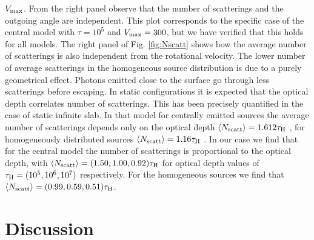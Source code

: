 $V_{\rm max}$.
From the right panel observe that the number of scatterings and the
outgoing angle are independent.
This plot corresponds to the specific case of the central model with
$\tau=10^5$ and $V_{\rm max}=300$\kms, but we have verified that this
holds for all models.
The right panel of Fig. \ref{fig:Nscatt} shows how the average
number of scatterings is also independent from the rotational
velocity.
The lower number of average scatterings in the homogeneous source
distribution is due to a purely geometrical effect.
Photons emitted close to the surface go through less scatterings
before escaping.
In static configurations it is expected that the optical depth correlates number of
scatterings.
This has been precisely quantified in the case of static infinite
slab.
In that model for centrally emitted sources the average number of
scatterings depends only on the optical depth $\langle N_{\rm
scatt}\rangle=1.612\tau_{\rm H}$ \citep{Adams72,Harrington73}, for
homogeneously distributed sources $\langle N_{\rm
scatt}\rangle=1.16\tau_{\rm H}$ \citep{Harrington73}.
In our case we find that for the central model the number of
scatterings is proportional to the optical depth, with $\langle N_{\rm
scatt}\rangle= (1.50, 1.00, 0.92)\tau_{\rm H}$ for optical depth
values of $\tau_{\rm H} = (10^{5}, 10^{6}, 10^{7})$ respectively.
For the homogeneous sources we find that $\langle N_{\rm
scatt}\rangle= (0.99, 0.59, 0.51)\tau_{\rm H}$.
\section{Discussion}
\label{sec:discussion}
